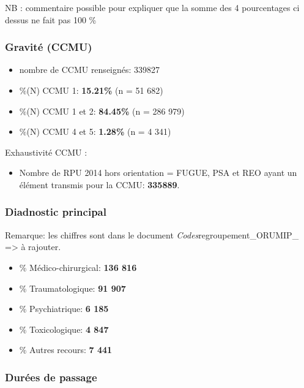 \documentclass[]{article}
\begin{document}
NB : commentaire possible pour expliquer que la somme des 4 pourcentages
ci dessus ne fait pas 100 \%

\subsubsection{Gravité (CCMU)}\label{gravite-ccmu}

\begin{itemize}
\itemsep1pt\parskip0pt
\item
  nombre de CCMU renseignés: 339827
\item
  \%(N) CCMU 1: \textbf{15.21\%} (n = 51 682)
\item
  \%(N) CCMU 1 et 2: \textbf{84.45\%} (n = 286 979)
\item
  \%(N) CCMU 4 et 5: \textbf{1.28\%} (n = 4 341)
\end{itemize}

Exhaustivité CCMU :

\begin{itemize}
\itemsep1pt\parskip0pt
\item
  Nombre de RPU 2014 hors orientation = FUGUE, PSA et REO ayant un
  élément transmis pour la CCMU: \textbf{335889}.
\end{itemize}

\subsubsection{Diadnostic principal}\label{diadnostic-principal}

Remarque: les chiffres sont dans le document
\emph{Codes}regroupement\_ORUMIP\_ =\textgreater{} à rajouter.

\begin{itemize}
\itemsep1pt\parskip0pt
\item
  \% Médico-chirurgical: \textbf{136 816}
\item
  \% Traumatologique: \textbf{91 907}
\item
  \% Psychiatrique: \textbf{6 185}
\item
  \% Toxicologique: \textbf{4 847}
\item
  \% Autres recours: \textbf{7 441}
\end{itemize}

\subsubsection{Durées de passage}\label{durees-de-passage}
\end{document}
